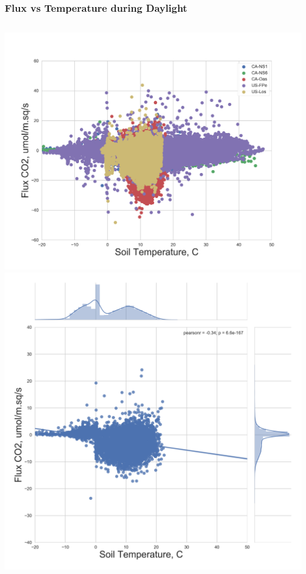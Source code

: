 \documentclass{beamer}
\begin{document}
\begin{frame}
\frametitle{Flux vs Temperature during Daylight}

\begin{columns}[t]
\centering
\includegraphics[width=\textwidth]{FvsT_day/all.png}\\
\includegraphics[width=\textwidth]{FvsT_day/CA-NS1.png}

\end{columns}
\end{frame}
\end{document}
